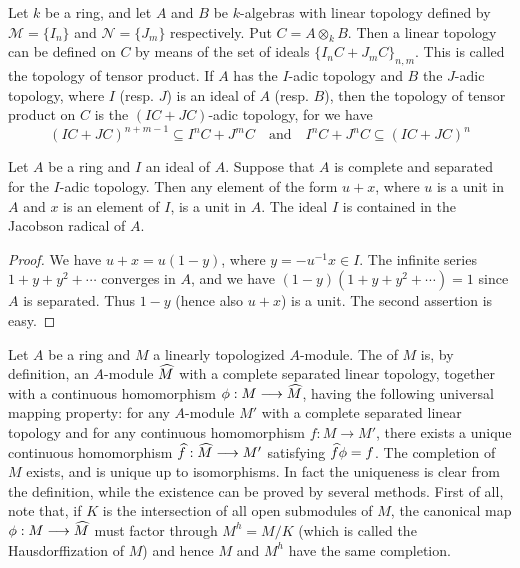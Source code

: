 \documentclass[../main]{subfiles}
\begin{document}
\newparagraph Let $k$ be a ring, and let $A$ and $B$ be $k$-algebras with linear topology defined by $\mathscr M = \{I_n\}$ and $\mathscr N = \{J_m\}$ respectively. Put $C = A \otimes_k B$. Then a linear topology can be defined on $C$ by means of the set of ideals $\{I_n C + J_m C\}_{n, m}$. This is called the topology of tensor product. If $A$ has the $I$-adic topology and $B$ the $J$-adic topology, where $I$ (resp. $J$) is an ideal of $A$ (resp. $B$), then the topology of tensor product on $C$ is the $(IC + JC)$-adic topology, for we have
\[
(IC + JC)^{n + m - 1} \subseteq I^n C + J^m C \quad \text {and} \quad I^n C + J^n C \subseteq (IC + JC)^n
\]

\begin{parproposition}
Let $A$ be a ring and $I$ an ideal of $A$. Suppose that $A$ is complete and separated for the $I$-adic topology. Then any element of the form $u + x$, where $u$ is a unit in $A$ and $x$ is an element of $I$, is a unit in $A$. The ideal $I$ is contained in the Jacobson radical of $A$. 
\end{parproposition}

\begin{proof}
We have $u + x = u(1 - y)$, where $y = -u^{-1} x \in I$. The infinite series $1 + y + y^2 + \cdots$ converges in $A$, and we have $(1 - y)(1 + y + y^2 + \cdots) = 1$ since $A$ is separated. Thus $1 - y$ (hence also $u + x$) is a unit. The second assertion is easy.
\end{proof}

\newparagraph Let $A$ be a ring and $M$ a linearly topologized $A$-module. The  of $M$ is, by definition, an $A$-module $\widehat{M}$ with a complete separated linear topology, together with a continuous homomorphism $\phi : M \longrightarrow \widehat{M}$, having the following universal mapping property: for any $A$-module $M'$ with a complete separated linear topology and for any continuous homomorphism $f : M \longrightarrow M'$, there exists a unique continuous homomorphism $\widehat{f} : \widehat{M} \longrightarrow M'$ satisfying $\widehat{f} \phi = f$. The completion of $M$ exists, and is unique up to isomorphisms. In fact the uniqueness is clear from the definition, while the existence can be proved by several methods. First of all, note that, if $K$ is the intersection of all open submodules of $M$, the canonical map $\phi : M \longrightarrow \widehat{M}$ must factor through $M^h = M/K$ (which is called the Hausdorffization of $M$) and hence $M$ and $M^h$ have the same completion. 
\end{document}
